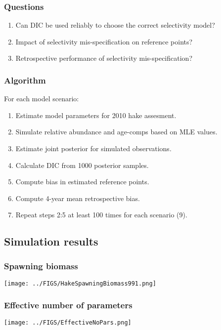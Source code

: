 \documentclass{beamer}
\begin{document}
\begin{frame}[m]\frametitle{Questions}
    \begin{enumerate}
    	\item Can DIC be used reliably to choose the correct selectivity model?
    	\item Impact of selectivity mis-specification on reference points?
    	\item Retrospective performance of selectivity mis-specification?
    \end{enumerate}
\end{frame}

\begin{frame}[m]\frametitle{Algorithm}
    For each model scenario:
	\begin{enumerate}
		\item Estimate model parameters for 2010 hake assesment.
		\item Simulate relative abundance and age-comps based on MLE values.
		\item Estimate joint posterior for simulated observations.
		\item Calculate DIC from 1000 posterior samples.
		\item Compute bias in estimated reference points.
		\item Compute 4-year mean retrospective bias.
		\item Repeat steps 2:5 at least 100 times for each scenario (9).
	\end{enumerate}

\end{frame}

\subsection{Simulation results} %
\label{sub:simulation_results}

\begin{frame}[m]\frametitle{Spawning biomass}
    \begin{center}
    	\texttt{[image: ../FIGS/HakeSpawningBiomass991.png]}
    \end{center}


\end{frame}

\begin{frame}[t]\frametitle{Effective number of parameters}
    
    \begin{center}
		\texttt{[image: ../FIGS/EffectiveNoPars.png]} 
    \end{center}

\end{frame}
\end{document}
